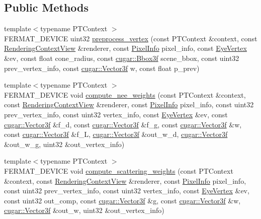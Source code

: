 \subsection*{Public Methods}
\begin{DoxyCompactItemize}
\item 
{\footnotesize template$<$typename P\+T\+Context $>$ }\\F\+E\+R\+M\+A\+T\+\_\+\+D\+E\+V\+I\+CE uint32 \hyperlink{struct_p_t_vertex_processor_aa234e9a79024286bf6a7e93dc7cf3d10}{preprocess\+\_\+vertex} (const P\+T\+Context \&context, const \hyperlink{struct_rendering_context_view}{Rendering\+Context\+View} \&renderer, const \hyperlink{union_pixel_info}{Pixel\+Info} pixel\+\_\+info, const \hyperlink{struct_eye_vertex}{Eye\+Vertex} \&ev, const float cone\+\_\+radius, const \hyperlink{structcugar_1_1_bbox}{cugar\+::\+Bbox3f} scene\+\_\+bbox, const uint32 prev\+\_\+vertex\+\_\+info, const \hyperlink{structcugar_1_1_vector}{cugar\+::\+Vector3f} w, const float p\+\_\+prev)
\item 
{\footnotesize template$<$typename P\+T\+Context $>$ }\\F\+E\+R\+M\+A\+T\+\_\+\+D\+E\+V\+I\+CE void \hyperlink{struct_p_t_vertex_processor_acca5b26b69481a1fada796bac4588b9b}{compute\+\_\+nee\+\_\+weights} (const P\+T\+Context \&context, const \hyperlink{struct_rendering_context_view}{Rendering\+Context\+View} \&renderer, const \hyperlink{union_pixel_info}{Pixel\+Info} pixel\+\_\+info, const uint32 prev\+\_\+vertex\+\_\+info, const uint32 vertex\+\_\+info, const \hyperlink{struct_eye_vertex}{Eye\+Vertex} \&ev, const \hyperlink{structcugar_1_1_vector}{cugar\+::\+Vector3f} \&f\+\_\+d, const \hyperlink{structcugar_1_1_vector}{cugar\+::\+Vector3f} \&f\+\_\+g, const \hyperlink{structcugar_1_1_vector}{cugar\+::\+Vector3f} \&w, const \hyperlink{structcugar_1_1_vector}{cugar\+::\+Vector3f} \&f\+\_\+L, \hyperlink{structcugar_1_1_vector}{cugar\+::\+Vector3f} \&out\+\_\+w\+\_\+d, \hyperlink{structcugar_1_1_vector}{cugar\+::\+Vector3f} \&out\+\_\+w\+\_\+g, uint32 \&out\+\_\+vertex\+\_\+info)
\item 
{\footnotesize template$<$typename P\+T\+Context $>$ }\\F\+E\+R\+M\+A\+T\+\_\+\+D\+E\+V\+I\+CE void \hyperlink{struct_p_t_vertex_processor_a832bbbc566d333cd7a0789690f5f7c62}{compute\+\_\+scattering\+\_\+weights} (const P\+T\+Context \&context, const \hyperlink{struct_rendering_context_view}{Rendering\+Context\+View} \&renderer, const \hyperlink{union_pixel_info}{Pixel\+Info} pixel\+\_\+info, const uint32 prev\+\_\+vertex\+\_\+info, const uint32 vertex\+\_\+info, const \hyperlink{struct_eye_vertex}{Eye\+Vertex} \&ev, const uint32 out\+\_\+comp, const \hyperlink{structcugar_1_1_vector}{cugar\+::\+Vector3f} \&g, const \hyperlink{structcugar_1_1_vector}{cugar\+::\+Vector3f} \&w, \hyperlink{structcugar_1_1_vector}{cugar\+::\+Vector3f} \&out\+\_\+w, uint32 \&out\+\_\+vertex\+\_\+info)

\end{DoxyCompactItemize}
